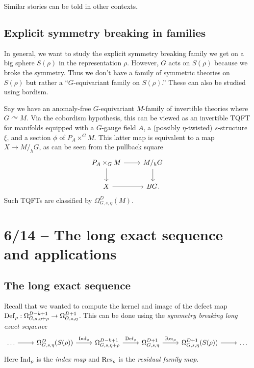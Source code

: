 Similar stories can be told in other contexts.

\subsection{Explicit symmetry breaking in families}

In general, we want to study the explicit symmetry breaking family we get on a big sphere $S(\rho)$ in the representation $\rho$.
However, $G$ acts on $S(\rho)$ because we broke the symmetry.
Thus we don't have a family of symmetric theories on $S(\rho)$ but rather a ``$G$-equivariant family on $S(\rho)$.''
These can also be studied using bordism.

Say we have an anomaly-free $G$-equivariant $M$-family of invertible theories where $G \curvearrowright M$.
Via the cobordism hypothesis, this can be viewed as an invertible TQFT for manifolds equipped with a $G$-gauge field $A$, a (possibly $\eta$-twisted) $s$-structure $\xi$, and a section $\phi$ of $P_A \times^G M$.
This latter map is equivalent to a map $X \to M /_h G$, as can be seen from the pullback square
\[
	\begin{tikzcd}
		P_A \times_G M \rar \dar & M /_h G \dar \\
		X \rar & BG.
	\end{tikzcd}
\]
Such TQFTs are classified by $\Omega^D_{G,s,\eta}(M)$.

\section{6/14 -- The long exact sequence and applications}

\subsection{The long exact sequence}

Recall that we wanted to compute the kernel and image of the defect map $\operatorname{Def}_\rho: \Omega_{G,s,\eta+\rho}^{D-k+1} \to \Omega_{G,s,\eta}^{D+1}$.
This can be done using the \emph{symmetry breaking long exact sequence}
\[
	\begin{tikzcd}
		\dots \rar & \Omega_{G,s,\eta}^D(S(\rho)) \rar["\Ind_\rho"] & \Omega_{G,s,\eta+\rho}^{D-k+1} \rar["\Def_\rho"] & \Omega_{G,s,\eta}^{D+1} \rar["\Res_\rho"] & \Omega_{G,s,\eta}^{D+1}(S(\rho)) \rar & \dots
	\end{tikzcd}
\]
Here $\operatorname{Ind}_\rho$ is the \emph{index map} and $\operatorname{Res}_\rho$ is the \emph{residual family map}.

